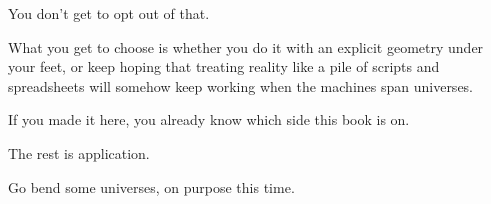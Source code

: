 You don’t get to opt out of that.

What you get to choose is whether you do it with an explicit geometry under
your feet, or keep hoping that treating reality like a pile of scripts and
spreadsheets will somehow keep working when the machines span universes.

\medskip

If you made it here, you already know which side this book is on.

The rest is application.

\begin{flushright}
Go bend some universes, on purpose this time.
\end{flushright}
